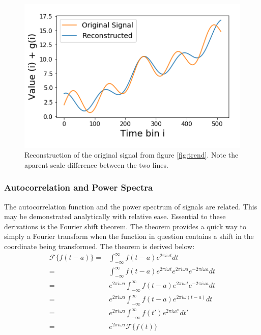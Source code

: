 \documentclass[twocolumn]{article}
\begin{document}
\begin{figure}
\centering
\includegraphics[width=\linewidth]{reconstruction_fixed}
\caption{Reconstruction of the original signal from figure \ref{fig:trend}. Note the aparent scale difference between the two lines.}
\label{fig:reconstruction_fixed}
\end{figure}

\subsubsection{Autocorrelation and Power Spectra}
The autocorrelation function and the power spectrum of signals are related. This may be demonstrated analytically with relative ease. Essential to these derivations is the Fourier shift theorem. The theorem provides a quick way to simply a Fourier transform when the function in question contains a shift in the coordinate being transformed. The theorem is derived below:
\begin{equation}
\begin{split}
\mathcal{F} \{f(t - a)\} = & \int_{-\infty}^{\infty} f(t-a) e^{2\pi i\omega t} dt \\
= & \int_{-\infty}^{\infty} f(t-a) e^{2\pi i\omega t} e^{2\pi i\omega a} e^{-2\pi i\omega a} dt \\
= & e^{2\pi i\omega a} \int_{-\infty}^{\infty} f(t-a) e^{2\pi i\omega t}  e^{-2\pi i\omega a} dt \\
= & e^{2\pi i\omega a} \int_{-\infty}^{\infty} f(t-a) e^{2\pi i\omega (t - a)} dt \\
= & e^{2\pi i\omega a} \int_{-\infty}^{\infty} f(t') e^{2\pi i\omega t'} dt' \\
= & e^{2\pi i\omega a} \mathcal{F} \{f(t)\}
\end{split}
\end{equation}
\end{document}
